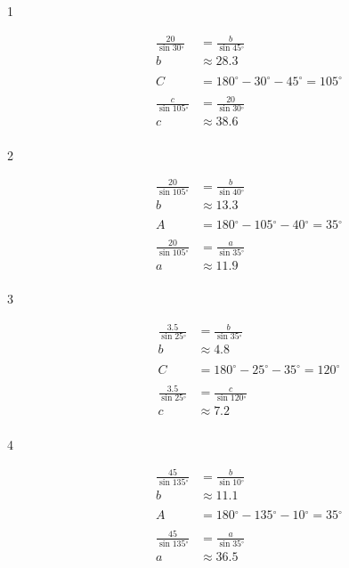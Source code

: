 \documentclass[fleqn,addpoints]{exam}
\newcommand{\degree}{\ensuremath{^\circ}}
\begin{document}
\begin{description}
\item[1] 
\begin{align*}
  \frac{20}{\sin 30 \degree} &= \frac{b}{\sin 45 \degree} \\
  b &\approx 28.3 \\
  \\
  C &= 180 \degree - 30 \degree - 45 \degree = 105 \degree \\
  \\
  \frac{c}{\sin 105 \degree} &= \frac{20}{\sin 30 \degree} \\
  c &\approx 38.6 \\
\end{align*}

\item[2] 
\begin{align*}
  \frac{20}{\sin 105 \degree} &= \frac{b}{\sin 40 \degree} \\
  b &\approx 13.3 \\
  \\
  A &= 180 \degree - 105 \degree - 40 \degree = 35 \degree \\
  \\
  \frac{20}{\sin 105 \degree} &= \frac{a}{\sin 35 \degree} \\
  a &\approx 11.9 \\
\end{align*}

\item[3] 
\begin{align*}
  \frac{3.5}{\sin 25 \degree} &= \frac{b}{\sin 35 \degree} \\
  b &\approx 4.8 \\
  \\
  C &= 180 \degree - 25 \degree - 35 \degree = 120 \degree \\
  \\
  \frac{3.5}{\sin 25 \degree} &= \frac{c}{\sin 120 \degree} \\
  c &\approx 7.2 \\
\end{align*}

\item[4] 
\begin{align*}
  \frac{45}{\sin 135 \degree} &= \frac{b}{\sin 10 \degree} \\
  b &\approx 11.1 \\
  \\
  A &= 180 \degree - 135 \degree - 10 \degree = 35 \degree \\
  \\
  \frac{45}{\sin 135 \degree} &= \frac{a}{\sin 35 \degree} \\
  a &\approx 36.5 \\
\end{align*}


\end{description}
\end{document}
